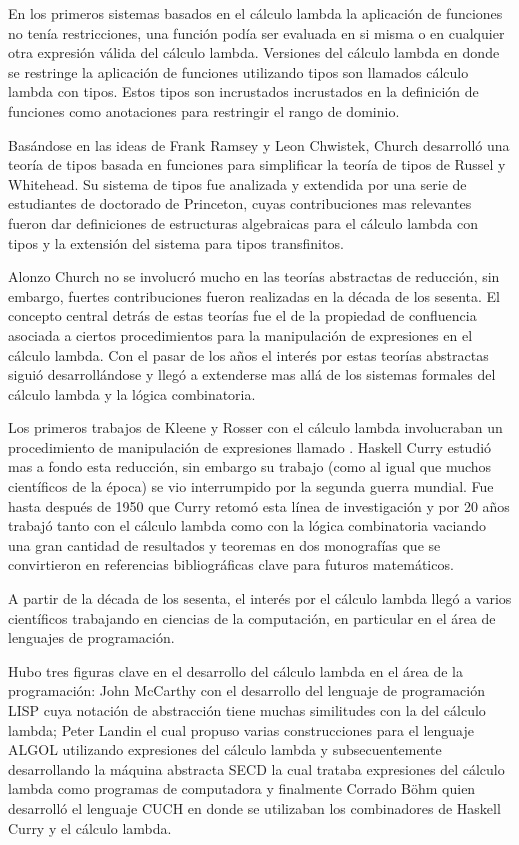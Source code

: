 En los primeros sistemas basados en el cálculo lambda la aplicación de
funciones no tenía restricciones, una función podía ser evaluada en si
misma o en cualquier otra expresión válida del cálculo lambda. Versiones del
cálculo lambda en donde se restringe la aplicación de funciones utilizando
tipos son llamados cálculo lambda con tipos. Estos tipos son incrustados
incrustados en la definición de funciones como anotaciones para
restringir el rango de dominio.\

Basándose en las ideas de Frank Ramsey y Leon Chwistek, Church
desarrolló una teoría de tipos basada en funciones para simplificar la
teoría de tipos de Russel y Whitehead. Su sistema de tipos fue
analizada y extendida por una serie de estudiantes de doctorado de
Princeton, cuyas contribuciones mas relevantes fueron dar definiciones
de estructuras algebraicas para el cálculo lambda con tipos y la extensión del
sistema para tipos transfinitos.\

Alonzo Church no se involucró mucho en las teorías abstractas de
reducción, sin embargo, fuertes contribuciones fueron realizadas en la
década de los sesenta. El concepto central detrás de estas teorías fue
el de la propiedad de confluencia asociada a ciertos procedimientos
para la manipulación de expresiones en el cálculo lambda. Con el pasar de los
años el interés por estas teorías abstractas siguió desarrollándose y
llegó a extenderse mas allá de los sistemas formales del cálculo lambda y la
lógica combinatoria.\

Los primeros trabajos de Kleene y Rosser con el cálculo lambda involucraban un
procedimiento de manipulación de expresiones llamado \betaredu. Haskell
Curry estudió mas a fondo esta reducción, sin embargo su trabajo (como
al igual que muchos científicos de la época) se vio interrumpido por
la segunda guerra mundial. Fue hasta después de 1950 que Curry retomó
esta línea de investigación y por 20 años trabajó tanto con el cálculo lambda
como con la lógica combinatoria vaciando una gran cantidad de
resultados y teoremas en dos monografías que se convirtieron en
referencias bibliográficas clave para futuros matemáticos.\

A partir de la década de los sesenta, el interés por el cálculo lambda llegó a
varios científicos trabajando en ciencias de la computación, en
particular  en el área de lenguajes de programación.\

Hubo tres figuras clave en el desarrollo del cálculo lambda en el área de la
programación: John McCarthy con el desarrollo del lenguaje de
programación LISP cuya notación de abstracción tiene muchas
similitudes con la del cálculo lambda; Peter Landin el cual propuso varias
construcciones para el lenguaje ALGOL utilizando expresiones del
cálculo lambda y subsecuentemente desarrollando la máquina abstracta SECD la cual
trataba expresiones del cálculo lambda como programas de computadora y
finalmente Corrado Böhm quien desarrolló el lenguaje CUCH en donde se
utilizaban los combinadores de Haskell Curry y el cálculo lambda.\

